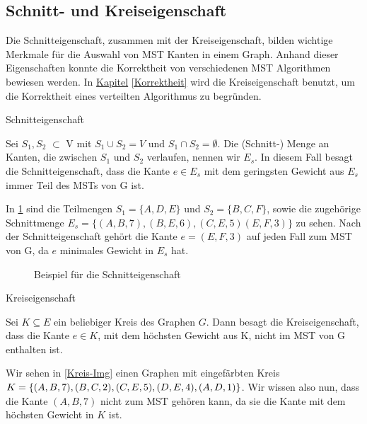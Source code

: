 \subsection{Schnitt- und Kreiseigenschaft}\label{Eigenschaften}

Die Schnitteigenschaft, zusammen mit der Kreiseigenschaft, bilden wichtige Merkmale für die Auswahl von MST Kanten in einem Graph. Anhand dieser Eigenschaften konnte die Korrektheit von verschiedenen MST Algorithmen bewiesen werden.
In \hyperref[Korrektheit]{Kapitel} \ref{Korrektheit} wird die Kreiseigenschaft benutzt, um die Korrektheit eines verteilten Algorithmus zu begründen.

\begin{mdframed}
\begin{thm}\label{Schnitteigenschaft}
    Schnitteigenschaft
\end{thm}
Sei $S_1,S_2$ $\subset$ V mit $S_1\cup S_2 = V$ und $S_1\cap S_2 = \emptyset$. Die (Schnitt-) Menge an Kanten, die zwischen $S_1$ und $S_2$ verlaufen, nennen wir $E_s$.
In diesem Fall besagt die Schnitteigenschaft, dass die Kante $e\in E_s$ mit dem geringsten Gewicht aus $E_s$ immer Teil des MSTs von G ist.
\end{mdframed}


In \cref{Schnitt-Img} sind die Teilmengen $S_1=\{A, D, E\}$ und $S_2=\{B, C, F\}$, sowie die zugehörige Schnittmenge $E_s=\{(A,B,7), (B,E,6), (C,E,5) (E,F,3)\}$ zu sehen. Nach der Schnitteigenschaft gehört die Kante $e =(E,F,3)$ auf jeden Fall zum MST von G, da $e$ minimales Gewicht in $E_s$ hat.


\begin{figure}[H]
    \centering
    
    \caption{Beispiel für die Schnitteigenschaft}
    \label{Schnitt-Img}
\end{figure}



\begin{mdframed}
\begin{thm} \label{Kreiseigenschaft}
    Kreiseigenschaft
\end{thm}
Sei $K \subseteq E$ ein beliebiger Kreis des Graphen $G$. Dann besagt die Kreiseigenschaft, dass die Kante $e \in K$, mit dem höchsten Gewicht aus K, nicht im MST von G enthalten ist.
\end{mdframed}

Wir sehen in \cref{Kreis-Img} einen Graphen mit eingefärbten Kreis $K =\{(A,B,7), (B,C,2), (C,E,5), \\ (D,E,4), (A,D,1)\}$.
Wir wissen also nun, dass die Kante $(A,B,7)$ nicht zum MST gehören kann, da sie die Kante mit dem höchsten Gewicht in $K$ ist.

